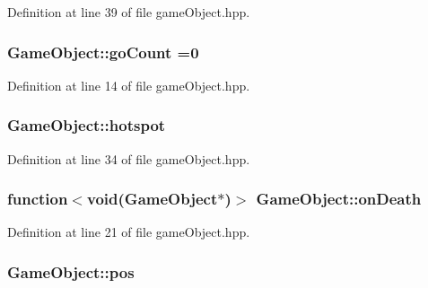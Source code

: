 Definition at line 39 of file game\-Object.\-hpp.

\hypertarget{class_game_object_a10af93a9092e2366773a4c8a26527d6d}{
\subsubsection[{go\-Count}]{ Game\-Object\-::go\-Count =0\hspace{0.3cm}{\ttfamily [static]}}}\label{class_game_object_a10af93a9092e2366773a4c8a26527d6d}


Definition at line 14 of file game\-Object.\-hpp.

\hypertarget{class_game_object_a42b24b440eaa2ef3c69e236b755f9ffc}{
\subsubsection[{hotspot}]{ Game\-Object\-::hotspot}}\label{class_game_object_a42b24b440eaa2ef3c69e236b755f9ffc}


Definition at line 34 of file game\-Object.\-hpp.

\hypertarget{class_game_object_a6956ff684f791c4f72e95083a1066127}{
\subsubsection[{on\-Death}]{\setlength{\rightskip}{0pt plus 5cm}function$<${\bf void}({\bf Game\-Object}$\ast$)$>$ Game\-Object\-::on\-Death}}\label{class_game_object_a6956ff684f791c4f72e95083a1066127}


Definition at line 21 of file game\-Object.\-hpp.

\hypertarget{class_game_object_a6973314aaec56412f367c0b55e7459b9}{
\subsubsection[{pos}]{ Game\-Object\-::pos}}\label{class_game_object_a6973314aaec56412f367c0b55e7459b9}


